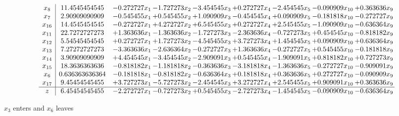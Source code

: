 \documentclass[10pt]{article}
\begin{document}
 \[\begin{array}{c| c c@{\hskip 2pt} c@{\hskip 2pt} c@{\hskip 2pt} c@{\hskip 2pt} c@{\hskip 2pt} c@{\hskip 2pt} c@{\hskip 2pt} }
 x_{8}   &  11.4545454545 & -0.272727 x_{1} & -1.727273 x_{2} & -3.454545 x_{3} & + 0.272727 x_{4} & -2.454545 x_{5} & -0.090909 x_{10} & + 0.363636 x_{9}\\
 x_{7}   &  2.90909090909 & -0.545455 x_{1} & + 0.545455 x_{2} & + 1.090909 x_{3} & -0.454545 x_{4} & + 0.090909 x_{5} & -0.181818 x_{10} & -0.272727 x_{9}\\
 x_{16}   &  14.4545454545 & -0.272727 x_{1} & + 4.272727 x_{2} & + 6.545455 x_{3} & + 0.272727 x_{4} & + 2.545455 x_{5} & -1.090909 x_{10} & -0.636364 x_{9}\\
 x_{11}   &  22.7272727273 & + 1.363636 x_{1} & -1.363636 x_{2} & -1.727273 x_{3} & -2.363636 x_{4} & -0.727273 x_{5} & + 0.454545 x_{10} & -0.818182 x_{9}\\
 x_{12}   &  5.54545454545 & + 0.272727 x_{1} & + 1.727273 x_{2} & -4.545455 x_{3} & + 3.727273 x_{4} & + 1.454545 x_{5} & + 0.090909 x_{10} & + 0.636364 x_{9}\\
 x_{13}   &  7.27272727273 & -3.363636 x_{1} & -2.636364 x_{2} & -0.272727 x_{3} & + 1.363636 x_{4} & -0.272727 x_{5} & + 0.545455 x_{10} & -0.181818 x_{9}\\
 x_{14}   &  3.90909090909 & + 4.454545 x_{1} & -3.454545 x_{2} & -2.909091 x_{3} & + 0.545455 x_{4} & -1.909091 x_{5} & + 0.818182 x_{10} & + 0.727273 x_{9}\\
 x_{15}   &  18.3636363636 & -0.818182 x_{1} & -1.181818 x_{2} & -0.363636 x_{3} & -3.181818 x_{4} & -1.363636 x_{5} & -0.272727 x_{10} & -0.909091 x_{9}\\
 x_{6}   &  0.636363636364 & -0.181818 x_{1} & -0.818182 x_{2} & -0.636364 x_{3} & + 0.181818 x_{4} & + 0.363636 x_{5} & + 0.272727 x_{10} & -0.090909 x_{9}\\
 x_{17}   &  9.45454545455 & + 3.727273 x_{1} & -5.727273 x_{2} & -2.454545 x_{3} & + 3.272727 x_{4} & + 2.545455 x_{5} & + 0.909091 x_{10} & + 0.363636 x_{9}\\
\hline
z    &  6.45454545455 & -2.272727 x_{1} & -0.727273 x_{2} & + 0.545455 x_{3} & -2.727273 x_{4} & -1.454545 x_{5} & -0.090909 x_{10} & -0.636364 x_{9}\\
\end{array}\]


 $ x_{3} $ enters and $ x_{6} $ leaves 
\end{document}
